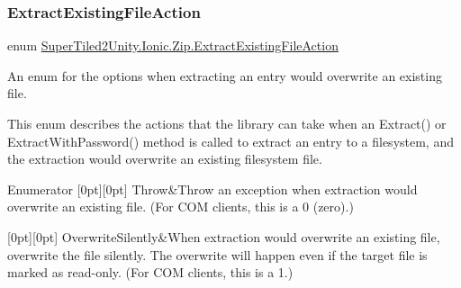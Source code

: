 \subsubsection{\texorpdfstring{Extract\+Existing\+File\+Action}{ExtractExistingFileAction}}
{\footnotesize\ttfamily enum \mbox{\hyperlink{namespace_super_tiled2_unity_1_1_ionic_1_1_zip_a3f8db7242d746d36b45114257b4fe4c0}{Super\+Tiled2\+Unity.\+Ionic.\+Zip.\+Extract\+Existing\+File\+Action}}\hspace{0.3cm}{\ttfamily [strong]}}



An enum for the options when extracting an entry would overwrite an existing file. 

This enum describes the actions that the library can take when an {\ttfamily Extract()} or {\ttfamily Extract\+With\+Password()} method is called to extract an entry to a filesystem, and the extraction would overwrite an existing filesystem file. \begin{DoxyEnumFields}{Enumerator}
[0pt][0pt]{}\mbox{\label{namespace_super_tiled2_unity_1_1_ionic_1_1_zip_a3f8db7242d746d36b45114257b4fe4c0a8ce61dd2505effd96f937fa743b6491f}} 
Throw&Throw an exception when extraction would overwrite an existing file. (For C\+OM clients, this is a 0 (zero).) \\
\hline

[0pt][0pt]{}\mbox{\label{namespace_super_tiled2_unity_1_1_ionic_1_1_zip_a3f8db7242d746d36b45114257b4fe4c0aa79e43bcce2e13d7d7f88ad674daf33c}} 
Overwrite\+Silently&When extraction would overwrite an existing file, overwrite the file silently. The overwrite will happen even if the target file is marked as read-\/only. (For C\+OM clients, this is a 1.) \\
\hline


\end{DoxyEnumFields}
